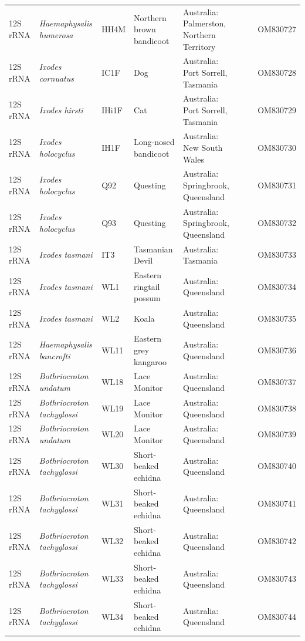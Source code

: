 \documentclass[a4paper, nobind]{templates/ociamthesis}
\begin{document}
\begin{landscape}
\begin{longtable}[t]{l>{}lllllll}
12S rRNA & \em{Haemaphysalis humerosa} & HH4M & Northern brown bandicoot & Australia: Palmerston, Northern Territory &  &  & OM830727\\
12S rRNA & \em{Ixodes cornuatus} & IC1F & Dog & Australia: Port Sorrell, Tasmania &  &  & OM830728\\
12S rRNA & \em{Ixodes hirsti} & IHi1F & Cat & Australia: Port Sorrell, Tasmania &  &  & OM830729\\
12S rRNA & \em{Ixodes holocyclus} & IH1F & Long-nosed bandicoot & Australia: New South Wales &  &  & OM830730\\
12S rRNA & \em{Ixodes holocyclus} & Q92 & Questing & Australia: Springbrook, Queensland &  &  & OM830731\\
12S rRNA & \em{Ixodes holocyclus} & Q93 & Questing & Australia: Springbrook, Queensland &  &  & OM830732\\
12S rRNA & \em{Ixodes tasmani} & IT3 & Tasmanian Devil & Australia: Tasmania &  &  & OM830733\\
12S rRNA & \em{Ixodes tasmani} & WL1 & Eastern ringtail possum & Australia: Queensland &  &  & OM830734\\
12S rRNA & \em{Ixodes tasmani} & WL2 & Koala & Australia: Queensland &  &  & OM830735\\
12S rRNA & \em{Haemaphysalis bancrofti} & WL11 & Eastern grey kangaroo & Australia: Queensland &  &  & OM830736\\
12S rRNA & \em{Bothriocroton undatum} & WL18 & Lace Monitor & Australia: Queensland &  &  & OM830737\\
12S rRNA & \em{Bothriocroton tachyglossi} & WL19 & Lace Monitor & Australia: Queensland &  &  & OM830738\\
12S rRNA & \em{Bothriocroton undatum} & WL20 & Lace Monitor & Australia: Queensland &  &  & OM830739\\
12S rRNA & \em{Bothriocroton tachyglossi} & WL30 & Short-beaked echidna & Australia: Queensland &  &  & OM830740\\
12S rRNA & \em{Bothriocroton tachyglossi} & WL31 & Short-beaked echidna & Australia: Queensland &  &  & OM830741\\
12S rRNA & \em{Bothriocroton tachyglossi} & WL32 & Short-beaked echidna & Australia: Queensland &  &  & OM830742\\
12S rRNA & \em{Bothriocroton tachyglossi} & WL33 & Short-beaked echidna & Australia: Queensland &  &  & OM830743\\
12S rRNA & \em{Bothriocroton tachyglossi} & WL34 & Short-beaked echidna & Australia: Queensland &  &  & OM830744\\

\end{longtable}
\end{landscape}
\end{document}
